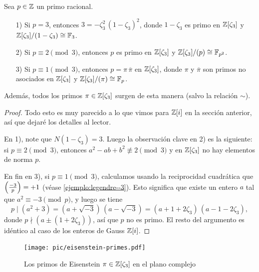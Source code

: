 \begin{proposicion}
  Sea $p \in \mathbb{Z}$ un primo racional.

  \begin{itemize}
  \item[1)] Si $p = 3$, entonces $3 = -\zeta_3^2\,(1-\zeta_3)^2$, donde
    $1-\zeta_3$ es primo en $\mathbb{Z} [\zeta_3]$ y
    $\mathbb{Z} [\zeta_3]/(1-\zeta_3) \cong \mathbb{F}_3$.

  \item[2)] Si $p \equiv 2 \pmod{3}$, entonces $p$ es primo en $\mathbb{Z} [\zeta_3]$
    y $\mathbb{Z} [\zeta_3]/(p) \cong \mathbb{F}_{p^2}$.

  \item[3)] Si $p \equiv 1 \pmod{3}$, entonces $p = \pi\,\overline{\pi}$
    en $\mathbb{Z} [\zeta_3]$, donde $\pi$ y $\overline{\pi}$ son primos no asociados
    en $\mathbb{Z} [\zeta_3]$ y $\mathbb{Z} [\zeta_3]/(\pi) \cong \mathbb{F}_p$.
  \end{itemize}

  Además, todos los primos $\pi \in \mathbb{Z} [\zeta_3]$ surgen de esta manera
  (salvo la relación $\sim$).

  \begin{proof}
    Todo esto es muy parecido a lo que vimos para $\mathbb{Z} [i]$ en la sección
    anterior, así que dejaré los detalles al lector.

    En 1), note que $N (1-\zeta_3) = 3$. Luego la observación clave en 2) es la
    siguiente: si $p \equiv 2 \pmod{3}$, entonces $a^2 - ab + b^2 \not\equiv
    2\pmod{3}$ y en $\mathbb{Z} [\zeta_3]$ no hay elementos de norma $p$.

    En fin en 3), si $p \equiv 1 \pmod{3}$, calculamos usando la reciprocidad
    cuadrática que $\left(\frac{-3}{p}\right) = +1$
    (véase \ref{ejemplo:legendre--3}). Esto significa que existe un entero $a$
    tal que $a^2 \equiv -3 \pmod{p}$, y luego se tiene
    \[ p \mid (a^2 + 3) = (a + \sqrt{-3})\,(a - \sqrt{-3})
           = (a + 1 + 2\zeta_3)\,(a - 1 - 2\zeta_3), \]
    donde $p \nmid (a \pm (1 + 2\zeta_3))$, así que $p$ no es primo. El resto
    del argumento es idéntico al caso de los enteros de Gauss $\mathbb{Z} [i]$.
  \end{proof}
\end{proposicion}

\begin{figure}
  \begin{center}
    \texttt{[image: pic/eisenstein-primes.pdf]}
  \end{center}

  \caption{Los primos de Eisenstein $\pi \in \mathbb{Z} [\zeta_3]$ en el plano complejo}
\end{figure}

